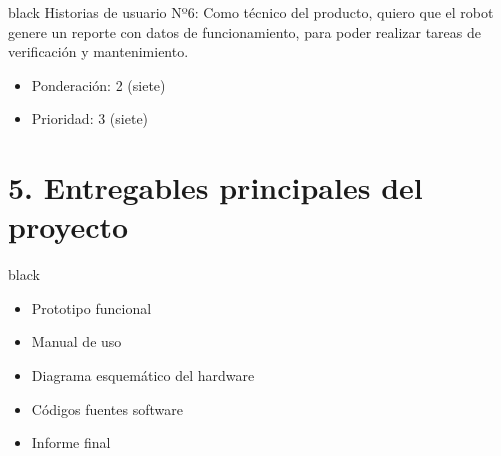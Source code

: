\documentclass[11pt]{charter}
\begin{document}
\begin{consigna}{black}
Historias de usuario Nº6: Como técnico del producto, quiero que el robot genere un reporte con datos de funcionamiento, para poder realizar tareas de verificación y mantenimiento.
\begin{itemize}
\item Ponderación: 2 (siete)
\item Prioridad: 3 (siete)
\end{itemize}  

\end{consigna}


\section{5. Entregables principales del proyecto}
\label{sec:entregables}
\vspace{-12mm}
\begin{consigna}{black}
\begin{itemize}
\item Prototipo funcional
\item Manual de uso
\item Diagrama esquemático del hardware
\item Códigos fuentes software
\item Informe final

\end{itemize}
\end{consigna}
\pagebreak
\end{document}
